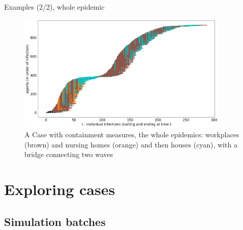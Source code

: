 \documentclass[9pt]{beamer}
\begin{document}
\begin{frame}{Examples (2/2), whole epidemic}

\begin{figure}[H]
\center
\includegraphics[width=0.9\textwidth]{with8a.png}%
\caption{A Case with containment measures, the whole epidemics: workplaces (brown) and nursing homes (orange) and then houses (cyan), with a bridge connecting two waves}
\label{workplacesNursingHomes}
\end{figure}


\end{frame}

\section{Exploring cases}

\subsection{Simulation batches}
\end{document}
